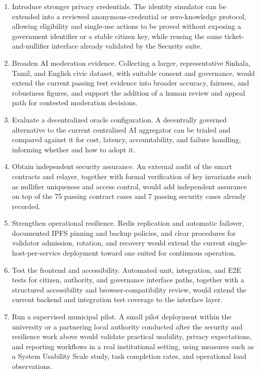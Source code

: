 \begin{enumerate}
    \item   {Introduce stronger privacy credentials.} The identity simulator can be extended into a reviewed anonymous-credential or zero-knowledge protocol, allowing eligibility and single-use actions to be proved without exposing a government identifier or a stable citizen key, while reusing the same ticket-and-nullifier interface already validated by the Security suite.

    \item   {Broaden AI moderation evidence.} Collecting a larger, representative Sinhala, Tamil, and English civic dataset, with suitable consent and governance, would extend the current passing test evidence into broader accuracy, fairness, and robustness figures, and support the addition of a human review and appeal path for contested moderation decisions.

    \item   {Evaluate a decentralized oracle configuration.} A decentrally governed alternative to the current centralized AI aggregator can be trialed and compared against it for cost, latency, accountability, and failure handling, informing whether and how to adopt it.

    \item   {Obtain independent security assurance.} An external audit of the smart contracts and relayer, together with formal verification of key invariants such as nullifier uniqueness and access control, would add independent assurance on top of the 75 passing contract cases and 7 passing security cases already recorded.

    \item   {Strengthen operational resilience.} Redis replication and automatic failover, documented IPFS pinning and backup policies, and clear procedures for validator admission, rotation, and recovery would extend the current single-host-per-service deployment toward one suited for continuous operation.

    \item   {Test the frontend and accessibility.} Automated unit, integration, and \ac{E2E} tests for citizen, authority, and governance interface paths, together with a structured accessibility and browser-compatibility review, would extend the current backend and integration test coverage to the interface layer.

    \item   {Run a supervised municipal pilot.} A small pilot deployment within the university or a partnering local authority conducted after the security and resilience work above would validate practical usability, privacy expectations, and reporting workflows in a real institutional setting, using measures such as a System Usability Scale study, task completion rates, and operational load observations.
\end{enumerate}

